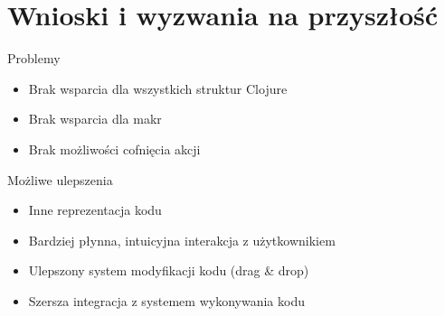 \documentclass[presentation]{beamer}
\begin{document}
\section{Wnioski i wyzwania na przyszłość}
\label{sec-5}
\begin{frame}[label=sec-5-1]{Problemy}
\begin{itemize}
\item Brak wsparcia dla wszystkich struktur Clojure
\item Brak wsparcia dla makr
\item Brak możliwości cofnięcia akcji
\end{itemize}
\end{frame}
\begin{frame}[label=sec-5-2]{Możliwe ulepszenia}
\begin{itemize}
\item Inne reprezentacja kodu
\item Bardziej płynna, intuicyjna interakcja z użytkownikiem
\item Ulepszony system modyfikacji kodu (drag \& drop)
\item Szersza integracja z systemem wykonywania kodu
\end{itemize}
\end{frame}
\end{document}
